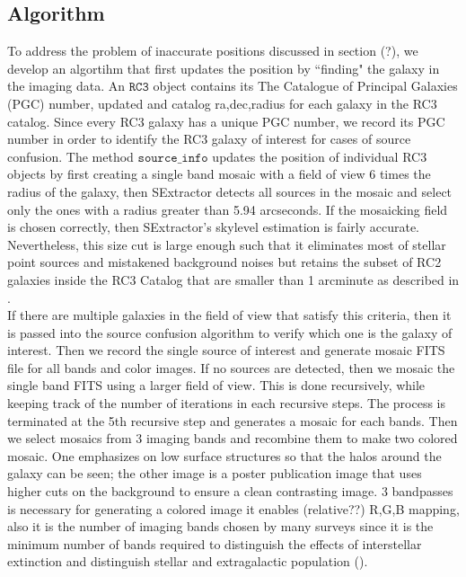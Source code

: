 \documentclass[5p]{elsarticle}
\begin{document}
	\subsection{Algorithm}
	To address the problem of inaccurate positions discussed in section (?), we develop an algortihm that first updates the position by ``finding" the galaxy in the imaging data. 
	An  $\texttt{RC3}$ object contains its The Catalogue of Principal Galaxies (PGC) number, updated and catalog ra,dec,radius for each galaxy in the RC3 catalog. Since every RC3 galaxy has a unique PGC number, we record  its PGC number in order to identify the RC3 galaxy of interest for cases of source confusion. The method $\texttt{source\_info}$ updates the position of individual RC3 objects by first creating a single band mosaic with a field of view 6 times the radius of the galaxy, then SExtractor detects all sources in the mosaic and select only the ones with a radius greater than 5.94 arcseconds.  If the mosaicking field is chosen correctly, then SExtractor's skylevel estimation is fairly accurate.  Nevertheless, this size cut is large enough such that it eliminates most of stellar point sources and mistakened background noises  but retains the subset of RC2 galaxies inside the RC3 Catalog that are smaller than 1 arcminute as described in \citet{rc2}. 
\\
\indent If there are multiple galaxies in the field of view that satisfy this criteria, then it is passed into the source confusion algorithm to verify which one is the galaxy of interest. Then we record the single source of interest and generate mosaic FITS file for all bands and color images. If no sources are detected, then we mosaic  the single band FITS using a larger field of view. This is done recursively, while keeping track of the number of iterations in each recursive steps. The process is terminated at the 5th recursive step and generates a mosaic for each bands. Then we select mosaics from 3 imaging bands  and recombine them to make two  colored mosaic. One emphasizes on low surface structures  so that the halos around the galaxy can be seen; the other image is a poster\/ publication image that uses higher cuts on the background to ensure a clean contrasting image. 3 bandpasses is necessary for generating a colored image it enables (relative??) R,G,B mapping, also it is the number of imaging bands chosen by many surveys since it is the minimum number of bands required to distinguish the effects of interstellar extinction and distinguish stellar and extragalactic population (\citet{2mass}).
\end{document}
